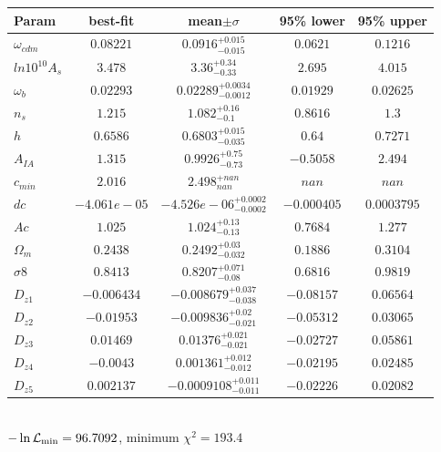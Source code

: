 \begin{tabular}{|l|c|c|c|c|} 
 \hline 
Param & best-fit & mean$\pm\sigma$ & 95\% lower & 95\% upper \\ \hline 
$\omega_{cdm }$ &$0.08221$ & $0.0916_{-0.015}^{+0.015}$ & $0.0621$ & $0.1216$ \\ 
$ln10^{10}A_{s }$ &$3.478$ & $3.36_{-0.33}^{+0.34}$ & $2.695$ & $4.015$ \\ 
$\omega_{b }$ &$0.02293$ & $0.02289_{-0.0012}^{+0.0034}$ & $0.01929$ & $0.02625$ \\ 
$n_{s }$ &$1.215$ & $1.082_{-0.1}^{+0.16}$ & $0.8616$ & $1.3$ \\ 
$h$ &$0.6586$ & $0.6803_{-0.035}^{+0.015}$ & $0.64$ & $0.7271$ \\ 
$A_{IA }$ &$1.315$ & $0.9926_{-0.73}^{+0.75}$ & $-0.5058$ & $2.494$ \\ 
$c_{min }$ &$2.016$ & $2.498_{nan}^{+nan}$ & $nan$ & $nan$ \\ 
$dc$ &$-4.061e-05$ & $-4.526e-06_{-0.0002}^{+0.0002}$ & $-0.000405$ & $0.0003795$ \\ 
$Ac$ &$1.025$ & $1.024_{-0.13}^{+0.13}$ & $0.7684$ & $1.277$ \\ 
$\Omega_{m }$ &$0.2438$ & $0.2492_{-0.032}^{+0.03}$ & $0.1886$ & $0.3104$ \\ 
$\sigma8$ &$0.8413$ & $0.8207_{-0.08}^{+0.071}$ & $0.6816$ & $0.9819$ \\ 
$D_{z1 }$ &$-0.006434$ & $-0.008679_{-0.038}^{+0.037}$ & $-0.08157$ & $0.06564$ \\ 
$D_{z2 }$ &$-0.01953$ & $-0.009836_{-0.021}^{+0.02}$ & $-0.05312$ & $0.03065$ \\ 
$D_{z3 }$ &$0.01469$ & $0.01376_{-0.021}^{+0.021}$ & $-0.02727$ & $0.05861$ \\ 
$D_{z4 }$ &$-0.0043$ & $0.001361_{-0.012}^{+0.012}$ & $-0.02195$ & $0.02485$ \\ 
$D_{z5 }$ &$0.002137$ & $-0.0009108_{-0.011}^{+0.011}$ & $-0.02226$ & $0.02082$ \\ 
\hline 
 \end{tabular} \\ 
$-\ln{\cal L}_\mathrm{min} =96.7092$, minimum $\chi^2=193.4$ \\ 
